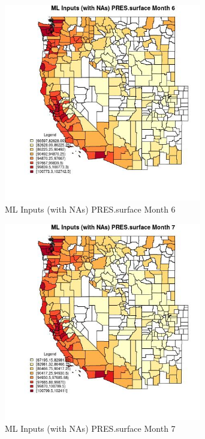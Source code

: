 \begin{figure} 
\centering  
\includegraphics[width=0.77\textwidth]{Code_Outputs/Report_ML_input_PM25_Step4_part_f_de_duplicated_aves_prioritize_24hr_obswNAs_CountyPRESsurfacemedianMonth6.jpg} 
\caption{\label{fig:Report_ML_input_PM25_Step4_part_f_de_duplicated_aves_prioritize_24hr_obswNAsCountyPRESsurfacemedianMonth6}ML Inputs (with NAs) PRES.surface Month 6} 
\end{figure} 
 

\clearpage 

\begin{figure} 
\centering  
\includegraphics[width=0.77\textwidth]{Code_Outputs/Report_ML_input_PM25_Step4_part_f_de_duplicated_aves_prioritize_24hr_obswNAs_CountyPRESsurfacemedianMonth7.jpg} 
\caption{\label{fig:Report_ML_input_PM25_Step4_part_f_de_duplicated_aves_prioritize_24hr_obswNAsCountyPRESsurfacemedianMonth7}ML Inputs (with NAs) PRES.surface Month 7} 
\end{figure} 
 

